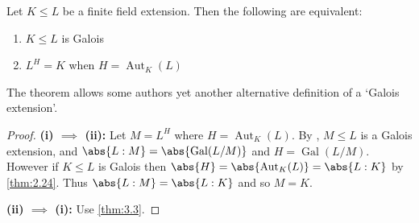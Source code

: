 \documentclass{article}
\DeclareMathOperator{\Aut}{Aut}
\DeclareMathOperator{\Gal}{Gal}
\begin{document}
\begin{nthm}\label{thm:3.4}
    Let $K \leq L$ be a finite field extension. Then the following are equivalent:
    \begin{enumerate}[label=(\roman*)]
        \item $K \leq L$ is Galois
        \item $L^H = K$ when $H = \Aut_K(L)$
    \end{enumerate}
\end{nthm}

\begin{remark}
    The theorem allows some authors yet another alternative definition of a `Galois extension'.
\end{remark}

\begin{proof}
    \textbf{(i) $\implies$ (ii):} Let $M = L^H$ where $H = \Aut_K(L)$.
    By , $M \leq L$ is a Galois extension, and $\abs{L:M} = \abs{\Gal(L/M)}$ and $H = \Gal(L/M)$.
    However if $K \leq L$ is Galois then $\abs{H} = \abs{\Aut_K(L)} = \abs{L:K}$ by \cref{thm:2.24}.
    Thus $\abs{L:M} = \abs{L:K}$ and so $M = K$.

    \textbf{(ii) $\implies$ (i):} Use \cref{thm:3.3}.
\end{proof}
\end{document}
